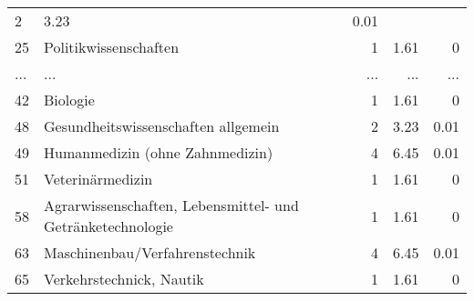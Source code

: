 \begin{longtable}{lXrrr}
          \num{2} &
          \num[round-mode=places,round-precision=2]{3.23} &
          \num[round-mode=places,round-precision=2]{0.01} \\
        25 & \multicolumn{1}{X}{Politikwissenschaften} & %
          \num{1} &
          \num[round-mode=places,round-precision=2]{1.61} &
          \num[round-mode=places,round-precision=2]{0} \\
       ... & ... & ... & ... & ... \\
        42 & \multicolumn{1}{X}{Biologie} & %
          \num{1} &
          \num[round-mode=places,round-precision=2]{1.61} &
          \num[round-mode=places,round-precision=2]{0} \\

        48 & \multicolumn{1}{X}{Gesundheitswissenschaften allgemein} & %
          \num{2} &
          \num[round-mode=places,round-precision=2]{3.23} &
          \num[round-mode=places,round-precision=2]{0.01} \\

        49 & \multicolumn{1}{X}{Humanmedizin (ohne Zahnmedizin)} & %
          \num{4} &
          \num[round-mode=places,round-precision=2]{6.45} &
          \num[round-mode=places,round-precision=2]{0.01} \\

        51 & \multicolumn{1}{X}{Veterinärmedizin} & %
          \num{1} &
          \num[round-mode=places,round-precision=2]{1.61} &
          \num[round-mode=places,round-precision=2]{0} \\

        58 & \multicolumn{1}{X}{Agrarwissenschaften, Lebensmittel- und Getränketechnologie} & %
          \num{1} &
          \num[round-mode=places,round-precision=2]{1.61} &
          \num[round-mode=places,round-precision=2]{0} \\

        63 & \multicolumn{1}{X}{Maschinenbau/Verfahrenstechnik} & %
          \num{4} &
          \num[round-mode=places,round-precision=2]{6.45} &
          \num[round-mode=places,round-precision=2]{0.01} \\

        65 & \multicolumn{1}{X}{Verkehrstechnick, Nautik} & %
          \num{1} &
          \num[round-mode=places,round-precision=2]{1.61} &
          \num[round-mode=places,round-precision=2]{0} \\


\end{longtable}
